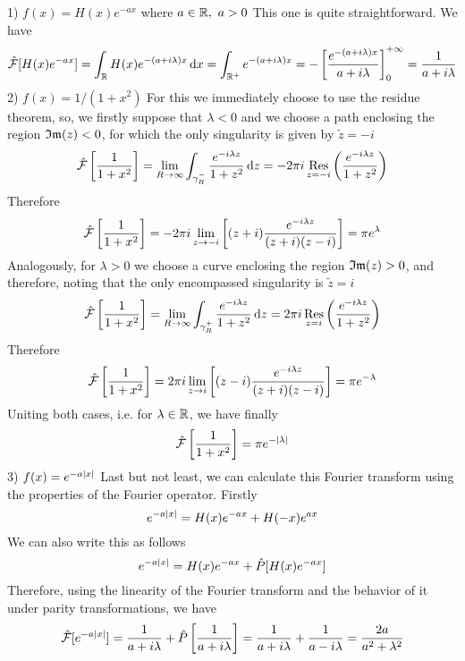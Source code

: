 \documentclass[../complete.tex]{subfiles}
\begin{document}
\begin{eg}
	1) $f(x)=H(x)e^{-ax}$ where $a\in\mathbb{R},\ a>0$
	This one is quite straightforward. We have
	\begin{equation*}
		\hat{\mathcal{F}}[H(x)e^{-ax}]=\int_{\mathbb{R}}^{}H(x)e^{-(a+i\lambda)x}\operatorname{d\!} x=\int_{\mathbb{R}^+}e^{-(a+i\lambda)x}=-\left[ \frac{e^{-(a+i\lambda)x}}{a+i\lambda} \right]_0^{+\infty}=\frac{1}{a+i\lambda}
	\end{equation*}
	2) $f(x)=1/(1+x^2)$
	For this we immediately choose to use the residue theorem, so, we firstly suppose that $\lambda<0$ and we choose a path enclosing the region $\mathfrak{Im}(z)<0$, for which the only singularity is given by $\tilde{z}=-i$
	\begin{equation*}
		\hat{\mathcal{F}}\left[ \frac{1}{1+x^2} \right]=\lim_{R\to\infty}\int_{\gamma_R^-}^{}\frac{e^{-i\lambda z}}{1+z^2}\operatorname{d\!} z=-2\pi i\operatorname*{\mathrm{Res}}_{z=-i}\left( \frac{e^{-i\lambda z}}{1+z^2} \right)
	\end{equation*}
	Therefore
	\begin{equation*}
		\hat{\mathcal{F}}\left[ \frac{1}{1+x^2} \right]=-2\pi i\lim_{z\to-i}\left[ (z+i)\frac{e^{-i\lambda z}}{(z+i)(z-i)} \right]=\pi e^\lambda
	\end{equation*}
	Analogously, for $\lambda>0$ we choose a curve enclosing the region $\mathfrak{Im}(z)>0$, and therefore, noting that the only encompassed singularity is $\tilde{z}=i$
	\begin{equation*}
		\hat{\mathcal{F}}\left[ \frac{1}{1+x^2} \right]=\lim_{R\to\infty}\int_{\gamma^+_R}^{}\frac{e^{-i\lambda z}}{1+z^2}\operatorname{d\!} z=2\pi i\operatorname*{\mathrm{Res}}_{z=i}\left( \frac{e^{-i\lambda z}}{1+z^2} \right)
	\end{equation*}
	Therefore
	\begin{equation*}
		\hat{\mathcal{F}}\left[ \frac{1}{1+x^2} \right]=2\pi i\lim_{z\to i}\left[ (z-i)\frac{e^{-i\lambda z}}{(z+i)(z-i)} \right]=\pi e^{-\lambda}
	\end{equation*}
	Uniting both cases, i.e. for $\lambda\in\mathbb{R}$, we have finally
	\begin{equation*}
		\hat{\mathcal{F}}\left[ \frac{1}{1+x^2} \right]=\pi e^{-\abs{\lambda}}
	\end{equation*}
	3) $f(x)=e^{-a\abs{x}}$
	Last but not least, we can calculate this Fourier transform using the properties of the Fourier operator. Firstly
	\begin{equation*}
		e^{-a\abs{x}}=H(x)e^{-ax}+H(-x)e^{ax}
	\end{equation*}
	We can also write this as follows
	\begin{equation*}
		e^{-a\abs{x}}=H(x)e^{-ax}+\hat{P}[H(x)e^{-ax}]
	\end{equation*}
	Therefore, using the linearity of the Fourier transform and the behavior of it under parity transformations, we have
	\begin{equation*}
		\hat{\mathcal{F}}[e^{-a\abs{x}}]=\frac{1}{a+i\lambda}+\hat{P}\left[ \frac{1}{a+i\lambda} \right]=\frac{1}{a+i\lambda}+\frac{1}{a-i\lambda}=\frac{2a}{a^2+\lambda^2}
	\end{equation*}
\end{eg}
\end{document}
